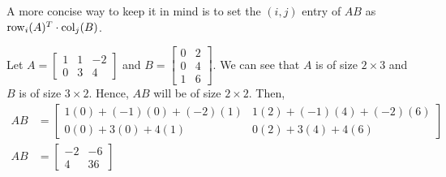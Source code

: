     A more concise way to keep it in mind is to set the \((i, j)\) entry of \(AB\) as \(\operatorname{row}_i(A)^T \cdot \operatorname{col}_j(B)\).

    \begin{example}
        Let \(A = \begin{bmatrix}
            1 & 1 & -2 \\ 0 & 3 & 4
        \end{bmatrix}\) and \(B = \begin{bmatrix}
            0 & 2 \\ 0 & 4 \\ 1 & 6
        \end{bmatrix}\). We can see that \(A\) is of size \(2 \times 3\) and \(B\) is of size \(3 \times 2\). Hence, \(AB\) will be of size \(2 \times 2\). Then,
        \begin{align*}
            AB &= \begin{bmatrix}
                1(0) + (-1)(0) + (-2)(1) & 1(2) + (-1)(4) + (-2)(6) \\
                0(0) + 3(0) + 4(1) & 0(2) + 3(4) + 4(6)
            \end{bmatrix} \\
            AB &= \begin{bmatrix}
                -2 & -6 \\
                4 & 36
            \end{bmatrix}
        \end{align*}
    \end{example}

